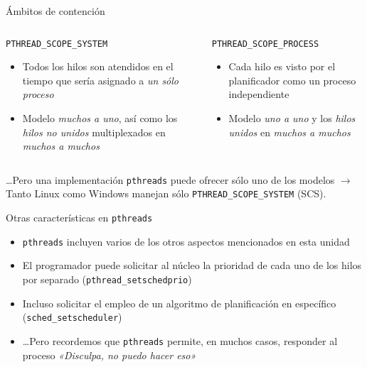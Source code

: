 \documentclass[presentation]{beamer}
\begin{document}
\begin{frame}[label={sec:org640c854},fragile]{Ámbitos de contención}
 \begin{columns}\begin{column}{0.5\textwidth}
\begin{center}
\texttt{PTHREAD\_SCOPE\_SYSTEM}
\end{center}
\begin{itemize}
\item Todos los hilos son atendidos en el tiempo que sería asignado a \emph{un
sólo proceso}
\item Modelo \emph{muchos a uno}, así como los \emph{hilos no unidos} multiplexados
en \emph{muchos a muchos}
\end{itemize}
\end{column}\begin{column}{0.5\textwidth}
\begin{center}
\texttt{PTHREAD\_SCOPE\_PROCESS}
\end{center}
\begin{itemize}
\item Cada hilo es visto por el planificador como un proceso independiente
\item Modelo \emph{uno a uno} y los \emph{hilos unidos} en \emph{muchos a muchos}
\end{itemize}
\end{column}\end{columns}
\begin{center}
\ldots{}Pero una implementación \texttt{pthreads} puede ofrecer sólo uno de los
modelos \(\rightarrow\) Tanto Linux como Windows manejan sólo
\texttt{PTHREAD\_SCOPE\_SYSTEM} (SCS).
\end{center}
\end{frame}
\begin{frame}[label={sec:orgb52bcb2},fragile]{Otras características en \texttt{pthreads}}
 \begin{itemize}
\item \texttt{pthreads} incluyen varios de los otros aspectos mencionados en
esta unidad
\item El programador puede solicitar al núcleo la prioridad de cada uno
de los hilos por separado (\texttt{pthread\_setschedprio})
\item Incluso solicitar el empleo de un algoritmo de planificación en
específico (\texttt{sched\_setscheduler})
\item \ldots{}Pero recordemos que \texttt{pthreads} permite, en muchos casos,
responder al proceso \emph{«Disculpa, no puedo hacer eso»}
\end{itemize}
\end{frame}
\end{document}
